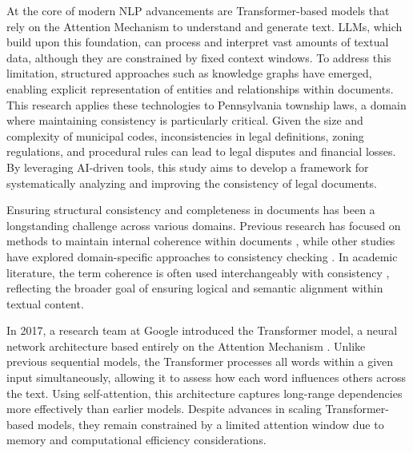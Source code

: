 At the core of modern NLP advancements are Transformer-based models that rely on the Attention Mechanism to understand and generate text. LLMs, which build upon this foundation, can process and interpret vast amounts of textual data, although they are constrained by fixed context windows. To address this limitation, structured approaches such as knowledge graphs have emerged, enabling explicit representation of entities and relationships within documents. This research applies these technologies to Pennsylvania township laws, a domain where maintaining consistency is particularly critical. Given the size and complexity of municipal codes, inconsistencies in legal definitions, zoning regulations, and procedural rules can lead to legal disputes and financial losses. By leveraging AI-driven tools, this study aims to develop a framework for systematically analyzing and improving the consistency of legal documents.

Ensuring structural consistency and completeness in documents has been a longstanding challenge across various domains. Previous research has focused on methods to maintain internal coherence within documents \parencite{RefWorks:RefID:13-laban2021transformer}, while other studies have explored domain-specific approaches to consistency checking \parencite{RefWorks:RefID:27-tröls2022instant}. In academic literature, the term coherence is often used interchangeably with consistency \parencite{RefWorks:RefID:14-shen2021evaluating}, reflecting the broader goal of ensuring logical and semantic alignment within textual content.

In 2017, a research team at Google introduced the Transformer model, a neural network architecture based entirely on the Attention Mechanism \parencite{RefWorks:RefID:81-vaswani2017attention}. Unlike previous sequential models, the Transformer processes all words within a given input simultaneously, allowing it to assess how each word influences others across the text. Using self-attention, this architecture captures long-range dependencies more effectively than earlier models. Despite advances in scaling Transformer-based models, they remain constrained by a limited attention window due to memory and computational efficiency considerations.

